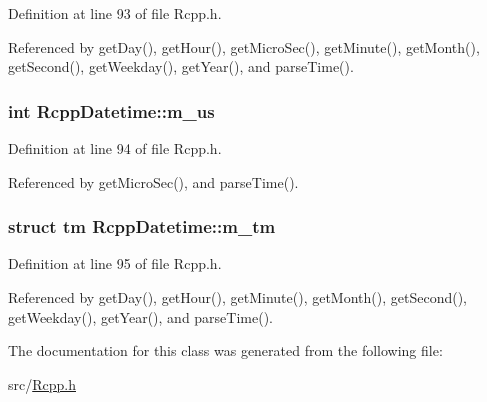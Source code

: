 Definition at line 93 of file Rcpp.h.

Referenced by getDay(), getHour(), getMicroSec(), getMinute(), getMonth(), getSecond(), getWeekday(), getYear(), and parseTime().\hypertarget{classRcppDatetime_68b9c7b759ffbba14aca3ae0680ea8a4}{
\subsubsection[m\_\-us]{\setlength{\rightskip}{0pt plus 5cm}int {\bf RcppDatetime::m\_\-us}}}
\label{classRcppDatetime_68b9c7b759ffbba14aca3ae0680ea8a4}




Definition at line 94 of file Rcpp.h.

Referenced by getMicroSec(), and parseTime().\hypertarget{classRcppDatetime_3f65c708657270208656c1be885e9f1b}{
\subsubsection[m\_\-tm]{\setlength{\rightskip}{0pt plus 5cm}struct tm {\bf RcppDatetime::m\_\-tm}}}
\label{classRcppDatetime_3f65c708657270208656c1be885e9f1b}




Definition at line 95 of file Rcpp.h.

Referenced by getDay(), getHour(), getMinute(), getMonth(), getSecond(), getWeekday(), getYear(), and parseTime().

The documentation for this class was generated from the following file:\begin{CompactItemize}
\item 
src/\hyperlink{Rcpp_8h}{Rcpp.h}\end{CompactItemize}
